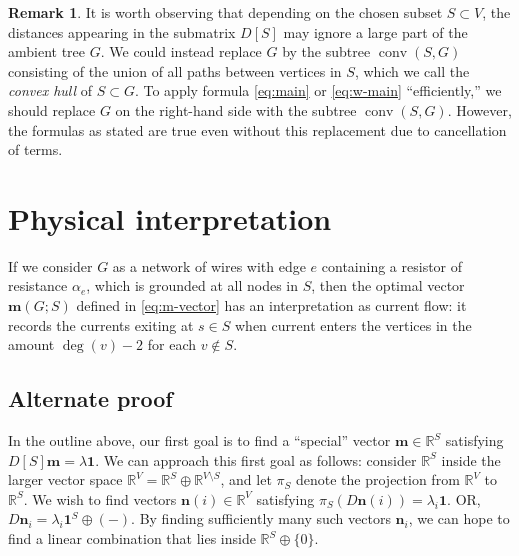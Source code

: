 \documentclass{amsart}
\theoremstyle{definition}
\newtheorem{rmk}[thm]{Remark}
\newcommand{\RR}{\mathbb{R}}
\newcommand{\boldm}{\mathbf{m}}
\DeclareMathOperator{\conv}{conv}
\begin{document}
\begin{rmk}
It is worth observing that depending on the chosen subset $S \subset V$, the distances appearing in the submatrix $D[S]$ may ignore a large part of the ambient tree $G$.
We could instead replace $G$ by the subtree  $\conv(S,G)$ consisting of the union of all paths between vertices in $S$,
which we call the {\em convex hull} of $S \subset G$.
To apply formula \eqref{eq:main} or \eqref{eq:w-main} ``efficiently,''
we should replace $G$ on the right-hand side with the subtree $\conv(S,G)$.
However, the formulas as stated are true even without this replacement due to cancellation of terms.
\end{rmk}

\section{Physical interpretation}

If we consider $G$ as a network of wires with edge $e$ containing a resistor of resistance $\alpha_e$,
which is grounded at all nodes in $S$,
then the optimal vector $\boldm(G; S)$ defined in \eqref{eq:m-vector} has an interpretation as current flow: 
it records the currents exiting at $s \in S$
when current enters the vertices in the amount $\deg(v) - 2$
for each $v\not\in S$.

\subsection{Alternate proof}


In the outline above, our first goal is to find a ``special'' vector $ \boldm\in \RR^S$ satisfying $D[S] \boldm = \lambda \mathbf{1}$.
We can approach this first goal as follows: 
consider $\RR^S$ inside the larger vector space $\RR^V = \RR^S \oplus \RR^{V\setminus S}$,
and let $\pi_S$ denote the projection from $\RR^V$ to $\RR^S$.
We wish to find vectors $\mathbf{n}(i) \in \RR^{V}$ satisfying
$\pi_S( D \mathbf{n}(i)) = \lambda_i \mathbf{1}$.
OR, $D \mathbf{n}_i = \lambda_i \mathbf{1}^S \oplus (-)$.
By finding sufficiently many such vectors $\mathbf{n}_i$,
we can hope to find a linear combination that lies inside $\RR^S \oplus \{0\}$.
\end{document}

